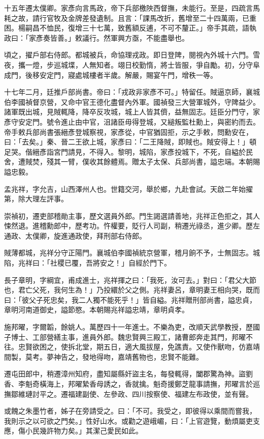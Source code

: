 \begin{pinyinscope}
十五年遷太僕卿。家彥向言馬政，帝下兵部檄陜西督撫，未能行。至是，四疏言馬耗之故，請行官牧及金牌差發遺制。且言：「課馬改折，舊增至二十四萬兩，已重困。楊嗣昌不恤民，復增三十七萬，致舊額反逋，不可不釐正。」帝手其疏，語執政曰：「家彥奏皆善。」敕議行。然軍興方亟，不能盡舉也。

頃之，擢戶部右侍郎。都城被兵，命協理戎政。即日登陴，閱視內外城十六門。雪夜，攜一燈，步巡城堞，人無知者。翊日校勤惰，將士皆服，爭自勵。初，分守阜成門，後移安定門，寢處城樓者半歲。解嚴，賜宴午門，增秩一等。

十七年二月，廷推戶部尚書。帝曰：「戎政非家彥不可。」特留任。賊逼京師，襄城伯李國禎督京營，又命中官王德化盡督內外軍。國禎發三大營軍城外，守陴益少。諸軍既出城，見賊輒降，降卒反攻城，城上人皆其儕，益無固志。廷臣分門守，家彥守安定門。號令進止由中官，沮諸臣毋得登城，又縋叛監杜勳上，與密約而去。帝手敕兵部尚書張縉彥登城察視，家彥從，中官猶固拒，示之手敕，問勳安在，曰：「去矣。」秦、晉二王欲上城，家彥曰：「二王降賊，即賊也。賊安得上！」頓足哭。偕縉彥詣宮門請見，不得入。黎明，城陷，家彥投城下，不死，自縊於民舍，遭賊焚，殘其一臂，僕收其餘體焉。贈太子太保、兵部尚書，謚忠端。本朝賜謚忠毅。

孟兆祥，字允吉，山西澤州人也。世籍交河，舉於鄉，九赴會試。天啟二年始擢第，除大理左評事。

崇禎初，遷吏部稽勛主事，歷文選員外郎。門生謁選請善地，兆祥正色拒之，其人悚然退。進稽勳郎中，歷考功。忤權要，貶行人司副，稍遷光祿丞，進少卿。歷左通政、太僕卿，旋進通政使，拜刑部右侍郎。

賊薄都城，兆祥分守正陽門。襄城伯李國禎統京營軍，稽月餉不予，士無固志。城陷，兆祥曰：「社稷已覆，吾將安之！」自經於門下。

長子章明，字綱宜，甫成進士，兆祥揮之曰：「我死，汝可去。」對曰：「君父大節也，君亡父死，我何生為！」乃投繯於父之側。兆祥妻呂，章明妻王相向哭，既而曰：「彼父子死忠矣，我二人獨不能死乎！」皆自縊。兆祥贈刑部尚書，謚忠貞，章明河南道御史，謚節愍。本朝賜兆祥謚忠靖，章明貞孝。

施邦曜，字爾韜，餘姚人。萬歷四十一年進士。不樂為吏，改順天武學教授，歷國子博士、工部營繕主事，進員外郎。魏忠賢興三殿工，諸曹郎奔走其門，邦曜不往。忠賢欲困之，使拆北堂，期五日，適大風拔屋，免譙責。又使作獸吻，仿嘉靖間製，莫考。夢神告之，發地得吻，嘉靖舊物也，忠賢不能難。

遷屯田郎中，稍遷漳州知府，盡知屬縣奸盜主名，每發輒得，闔郡驚為神。盜劉香、李魁奇橫海上，邦曜縶香母誘之，香就擒。魁奇援鄭芝龍事請撫，邦曜言於巡撫鄒維璉討平之。遷福建副使、左參政、四川按察使、福建左布政使，並有聲。

或餽之朱墨竹者，姊子在旁請受之。曰：「不可。我受之，即彼得以乘間而嘗我，我則示之以可欲之門矣。」性好山水。或勸之遊峨嵋，曰：「上官遊覽，動煩屬吏支應，傷小民幾許物力矣。」其潔己愛民如此。


\end{pinyinscope}
